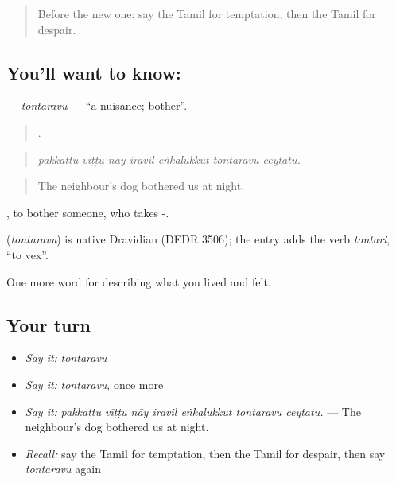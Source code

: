 \label{lesson:TA-C464-tontaravu}



\begin{quote}
Before the new one: say the Tamil for temptation, then the Tamil for despair.
\end{quote}

\subsection*{You'll want to know: }
\textbf{} — \emph{tontaravu} — \textquotedblleft{}a nuisance; bother\textquotedblright{}.

\begin{quote}
      .
\end{quote}

\begin{quote}
\emph{pakkattu vīṭṭu nāy iravil eṅkaḷukkut tontaravu ceytatu.}
\end{quote}

\begin{quote}
The neighbour’s dog bothered us at night.
\end{quote}

 , to bother someone, who takes -.

\begin{cousinweb}
\textbf{} (\emph{tontaravu}) is native Dravidian (DEDR 3506); the entry adds the verb  \emph{tontari}, \textquotedblleft{}to vex\textquotedblright{}.
\end{cousinweb}

\begin{grammarlens}[title={What you've built}]
One more word for describing what you lived and felt.
\end{grammarlens}

\subsection*{Your turn}
\begin{itemize}
\raggedright
  \item \emph{Say it:} \emph{tontaravu}
  \item \emph{Say it:} \emph{tontaravu}, once more
  \item \emph{Say it:} \emph{pakkattu vīṭṭu nāy iravil eṅkaḷukkut tontaravu ceytatu.} — The neighbour’s dog bothered us at night.
  \item \emph{Recall:} say the Tamil for temptation, then the Tamil for despair, then say \emph{tontaravu} again
\end{itemize}

